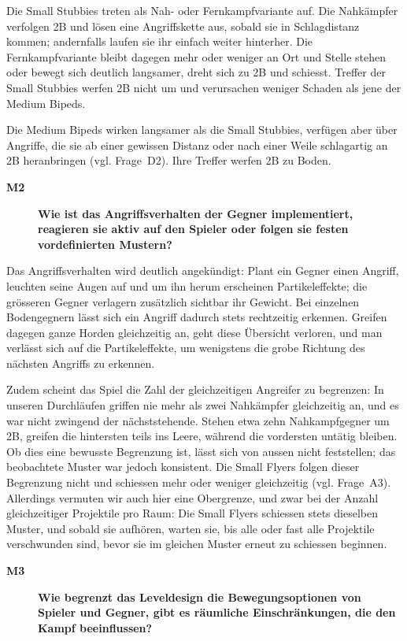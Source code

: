 \documentclass[../Main.tex]{subfiles}
\begin{document}
Die Small Stubbies treten als Nah- oder Fernkampfvariante auf. Die Nahkämpfer verfolgen 2B und lösen eine Angriffskette aus, sobald sie in Schlagdistanz kommen; andernfalls laufen sie ihr einfach weiter hinterher. Die Fernkampfvariante bleibt dagegen mehr oder weniger an Ort und Stelle stehen oder bewegt sich deutlich langsamer, dreht sich zu 2B und schiesst. Treffer der Small Stubbies werfen 2B nicht um und verursachen weniger Schaden als jene der Medium Bipeds.

Die Medium Bipeds wirken langsamer als die Small Stubbies, verfügen aber über Angriffe, die sie ab einer gewissen Distanz oder nach einer Weile schlagartig an 2B heranbringen (vgl. Frage~D2). Ihre Treffer werfen 2B zu Boden.

\begin{description}
  \item[\textbf{M2}] \textbf{Wie ist das Angriffsverhalten der Gegner implementiert, reagieren sie aktiv auf den Spieler oder folgen sie festen vordefinierten Mustern?}
\end{description}

Das Angriffsverhalten wird deutlich angekündigt: Plant ein Gegner einen Angriff, leuchten seine Augen auf und um ihn herum erscheinen Partikeleffekte; die grösseren Gegner verlagern zusätzlich sichtbar ihr Gewicht. Bei einzelnen Bodengegnern lässt sich ein Angriff dadurch stets rechtzeitig erkennen. Greifen dagegen ganze Horden gleichzeitig an, geht diese Übersicht verloren, und man verlässt sich auf die Partikeleffekte, um wenigstens die grobe Richtung des nächsten Angriffs zu erkennen.

Zudem scheint das Spiel die Zahl der gleichzeitigen Angreifer zu begrenzen: In unseren Durchläufen griffen nie mehr als zwei Nahkämpfer gleichzeitig an, und es war nicht zwingend der nächststehende. Stehen etwa zehn Nahkampfgegner um 2B, greifen die hintersten teils ins Leere, während die vordersten untätig bleiben. Ob dies eine bewusste Begrenzung ist, lässt sich von aussen nicht feststellen; das beobachtete Muster war jedoch konsistent. Die Small Flyers folgen dieser Begrenzung nicht und schiessen mehr oder weniger gleichzeitig (vgl. Frage~A3). Allerdings vermuten wir auch hier eine Obergrenze, und zwar bei der Anzahl gleichzeitiger Projektile pro Raum: Die Small Flyers schiessen stets dieselben Muster, und sobald sie aufhören, warten sie, bis alle oder fast alle Projektile verschwunden sind, bevor sie im gleichen Muster erneut zu schiessen beginnen.


\begin{description}
  \item[\textbf{M3}] \textbf{Wie begrenzt das Leveldesign die Bewegungsoptionen von Spieler und Gegner, gibt es räumliche Einschränkungen, die den Kampf beeinflussen?}
\end{description}
\end{document}

